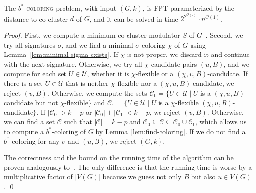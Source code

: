 \documentclass[runningheads, envcountsame]{llncs}
\newcommand{\sep}{\;|\;}
\newcommand{\seq}{\subseteq}
\newcommand{\ca}{\mathcal}
\newcommand{\FPT}{\textsf{FPT}\xspace}
\newcommand{\bscoloring}{$b^*$-\textsc{coloring}\xspace}
\begin{document}
\begin{theorem}
The \bscoloring problem, with input $(G, k)$, is \FPT parameterized by the distance to co-cluster $d$ of $G$, and it can be solved in time $2^{2^{\ca O(p)}} \cdot n^{\ca O(1)}$.
\end{theorem}
\begin{proof}
First, we compute a minimum co-cluster modulator $S$ of $G$~\cite{boral2016fast}.
Second, we try all signatures $\sigma$, and we find a minimal $\sigma$-coloring $\chi$ of $G$ using Lemma~\ref{lem:minimal-sigma-exists}.
If $\chi$ is not proper, we discard it and continue with the next signature. Otherwise, we try all $\chi$-candidate pairs $(u, B)$, and we compute for each set $U\in \ca U$, whether it is $\chi$-flexible or a $(\chi, u, B)$-candidate.
If there is a set $U\in\ca U$ that is neither $\chi$-flexible nor a $(\chi, u, B)$-candidate, we reject $(u, B)$. Otherwise, we compute the sets $\ca C_0 = \{U\in\ca U\sep U$ is a $(\chi, u, B)$-candidate but not $\chi$-flexible$\}$ and $\ca C_1 = \{U\in\ca U\sep U$ is a $\chi$-flexible $(\chi, u, B)$-candidate$\}$. 
If $|\ca C_0| > k-p$ or $|\ca C_0| + |\ca C_1| < k-p$, we reject $(u, B)$. Otherwise, we can find a set $\ca C$ such that $|\ca C| = k-p$ and $\ca C_0 \seq\ca C\seq\ca C_0\cup\ca C_1$, which allows us to compute a $b^*$-coloring of $G$ by Lemma~\ref{lem:find-coloring}. If we do not find a $b^*$-coloring for any $\sigma$ and $(u, B)$, we reject $(G, k)$.

The correctness and the bound on the running time of the algorithm can be proven analogously to~\cite[Theorem 7]{DBLP:conf/mfcs/Balaban26}.
The only difference is that the running time is worse by a multiplicative factor of $|V(G)|$ because we guess not only $B$ but also $u \in V(G)$.
\qed\end{proof}



\end{document}
